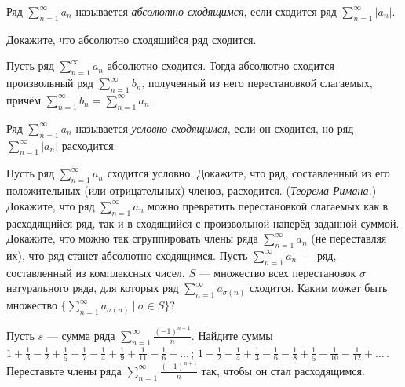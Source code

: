 \documentclass[a4paper,11pt]{article}
\begin{document}
Ряд $\sum\limits_{n=1}^\infty a_n$ называется
{\em абсолютно сходящимся}, если сходится ряд
$\sum\limits_{n=1}^\infty|a_n|$.

Докажите, что абсолютно сходящийся ряд сходится.

Пусть ряд $\sum\limits_{n=1}^\infty a_n$ абсолютно
сходится. Тогда абсолютно сходится произвольный ряд
$\sum\limits_{n=1}^\infty b_n$, полученный из него
перестановкой слагаемых, причём
$\sum\limits_{n=1}^\infty b_n=\sum\limits_{n=1}^\infty a_n$.

Ряд $\sum\limits_{n=1}^\infty a_n$ называется
{\em условно сходящимся}, если он сходится,
но ряд $\sum\limits_{n=1}^\infty|a_n|$ расходится.

Пусть ряд $\sum\limits_{n=1}^\infty a_n$ сходится условно.
Докажите, что ряд, составленный из его положительных
(или отрицательных) членов, расходится.
({\em Теорема Римана.})
Докажите, что ряд $\sum\limits_{n=1}^\infty a_n$ можно превратить
перестановкой слагаемых как в расходящийся ряд, так и в сходящийся
с произвольной наперёд заданной суммой.
Докажите, что можно так сгруппировать члены ряда
$\sum\limits_{n=1}^\infty a_n$ (не переставляя их),
что ряд станет абсолютно сходящимся.
Пусть $\sum\limits_{n=1}^\infty a_n$~--- ряд, составленный
из комплексных чисел, $S$ --- множество всех перестановок $\sigma$
натурального ряда, для которых ряд $\sum\limits_{n=1}^\infty a_{\sigma(n)}$
сходится. Каким может быть множество
$\{\sum\limits_{n=1}^\infty a_{\sigma(n)}\ |\ \sigma\in S\}$?



Пусть $s$ --- сумма ряда
$\sum\limits_{n=1}^\infty \frac{(-1)^{n+1}}{n}$. %
Найдите суммы\\
$1+\frac13-\frac12+\frac15+\frac17-\frac14+\frac19+\frac1{11}-\frac16+\ldots$\,;
$1-\frac12-\frac14+\frac13-\frac16-\frac18+\frac15-\frac1{10}-\frac1{12}+\ldots$\,.\\
Переставьте члены ряда $\sum\limits_{n=1}^\infty \frac{(-1)^{n+1}}{n}$
так, чтобы он стал расходящимся.


\end{document}

